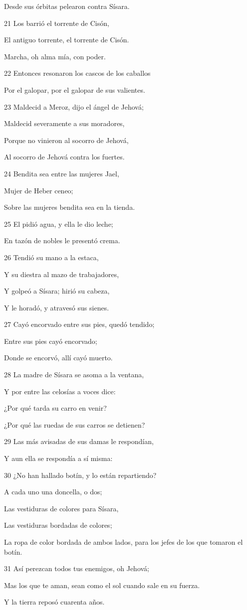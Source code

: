 \par Desde sus órbitas pelearon contra Sísara.
\par 21 Los barrió el torrente de Cisón,
\par El antiguo torrente, el torrente de Cisón.
\par Marcha, oh alma mía, con poder.
\par 22 Entonces resonaron los cascos de los caballos
\par Por el galopar, por el galopar de sus valientes.
\par 23 Maldecid a Meroz, dijo el ángel de Jehová;
\par Maldecid severamente a sus moradores,
\par Porque no vinieron al socorro de Jehová,
\par Al socorro de Jehová contra los fuertes.
\par 24 Bendita sea entre las mujeres Jael,
\par Mujer de Heber ceneo;
\par Sobre las mujeres bendita sea en la tienda.
\par 25 El pidió agua, y ella le dio leche; 
\par En tazón de nobles le presentó crema.
\par 26 Tendió su mano a la estaca,
\par Y su diestra al mazo de trabajadores,
\par Y golpeó a Sísara; hirió su cabeza,
\par Y le horadó, y atravesó sus sienes. 
\par 27 Cayó encorvado entre sus pies, quedó tendido;
\par Entre sus pies cayó encorvado;
\par Donde se encorvó, allí cayó muerto.
\par 28 La madre de Sísara se asoma a la ventana,
\par Y por entre las celosías a voces dice:
\par ¿Por qué tarda su carro en venir?
\par ¿Por qué las ruedas de sus carros se detienen?
\par 29 Las más avisadas de sus damas le respondían,
\par Y aun ella se respondía a sí misma:
\par 30 ¿No han hallado botín, y lo están repartiendo?
\par A cada uno una doncella, o dos;
\par Las vestiduras de colores para Sísara,
\par Las vestiduras bordadas de colores;
\par La ropa de color bordada de ambos lados, para los jefes de los que tomaron el botín.
\par 31 Así perezcan todos tus enemigos, oh Jehová;
\par Mas los que te aman, sean como el sol cuando sale en su fuerza.
\par Y la tierra reposó cuarenta años.

